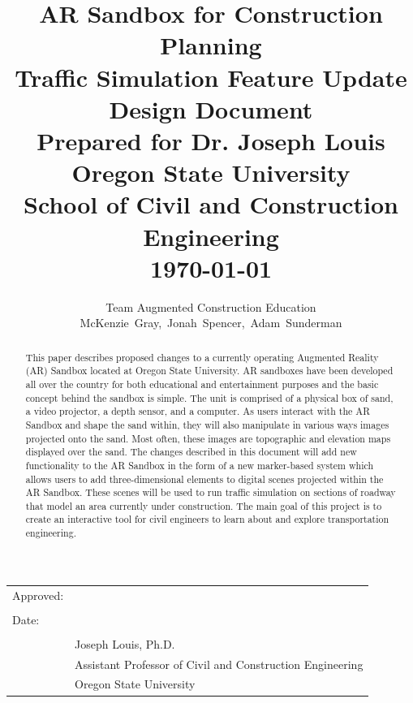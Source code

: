 \documentclass[letterpaper, 10pt, onecolumn, draftclsnofoot]{IEEEtran}
\title{\Large{\textbf{AR Sandbox for Construction Planning \\
                      Traffic Simulation Feature Update \\ 
                      \large{Design Document}}} \\
                      \vspace{5pt}
                      \small{Prepared for Dr. Joseph Louis \\
                      Oregon State University \\
                      School of Civil and Construction Engineering}\\
                      \today}
\author{Team Augmented Construction Education \\
       McKenzie~Gray,~Jonah~Spencer,~Adam~Sunderman}
\begin{document}
\maketitle
\vspace{30pt}
\begin{center}
\begin{tabular}{@{}p{.5in}p{4in}@{}}
Approved: & \hrulefill \\
& \hspace{10em} \\
Date: & \hrulefill \\
& \hspace{10em} \\
& Joseph Louis, Ph.D.\\
& Assistant Professor of Civil and Construction Engineering \\
& Oregon State University \\
\end{tabular}
\end{center}
\vspace{50pt}

\begin{abstract}
    This paper describes proposed changes to a currently operating Augmented Reality (AR) Sandbox located at Oregon State University. AR sandboxes have been developed all over the country for both educational and entertainment purposes and the basic concept behind the sandbox is simple. The unit is comprised of a physical box of sand, a video projector, a depth sensor, and a computer. As users interact with the AR Sandbox and shape the sand within, they will also manipulate in various ways images projected onto the sand. Most often, these images are topographic and elevation maps displayed over the sand. The changes described in this document will add new functionality to the AR Sandbox in the form of a new marker-based system which allows users to add three-dimensional elements to digital scenes projected within the AR Sandbox. These scenes will be used to run traffic simulation on sections of roadway that model an area currently under construction. The main goal of this project is to create an interactive tool for civil engineers to learn about and explore transportation engineering.  
\end{abstract}
\newpage
\tableofcontents
\clearpage
\newpage

\end{document}
